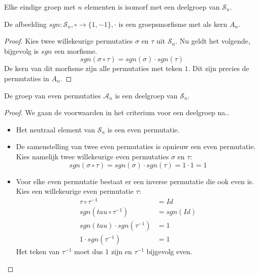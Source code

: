 \documentclass[main.tex]{subfiles}
\begin{document}
\begin{gev}
  Elke eindige groep met $n$ elementen is isomorf met een deelgroep van $\mathcal{S}_{n}$.

\end{gev}

\begin{pr}
  \label{pr:sgn-groepsmorfisme}
  De afbeelding $sgn: \mathcal{S}_{n},\circ \rightarrow \{1,-1\},\cdot$ is een groepsmorfisme met als kern $A_{n}$.

  \begin{proof}
    Kies twee willekeurige permutaties $\sigma$ en $\tau$ uit $\mathcal{S}_{n}$.
    Nu geldt het volgende, bijgevolg is $sgn$ een morfisme.
    \[ sgn(\sigma \circ \tau) = sgn(\sigma) \cdot sgn(\tau) \]
    De kern van dit morfisme zijn alle permutaties met teken $1$.
    Dit zijn precies de permutaties in $A_{n}$.
  \end{proof}
\end{pr}
 
\begin{pr}
  De groep van even permutaties $\mathcal{A}_{n}$ is een deelgroep van $\mathcal{S}_{n}$.
  \begin{proof}
    We gaan de voorwaarden in het criterium voor een deelgroep na..
    \begin{itemize}
    \item Het neutraal element van $\mathcal{S}_{n}$ is een even permutatie.
    \item De samenstelling van twee even permutaties is opnieuw een even permutatie.
      Kies namelijk twee willekeurige even permutaties $\sigma$ en $\tau$:
      \[ sgn(\sigma \circ \tau) = sgn(\sigma) \cdot sgn(\tau) = 1 \cdot 1 = 1 \]
    \item Voor elke even permutatie bestaat er een inverse permutatie die ook even is.
      Kies een willekeurige even permutatie $\tau$:
      \[
      \begin{array}{rl}
        \tau \circ \tau^{-1} &= Id\\
        sgn(tau \circ \tau^{-1}) &= sgn(Id)\\
        sgn(tau) \cdot sgn(\tau^{-1}) &= 1\\
        1 \cdot sgn(\tau^{-1}) &= 1
      \end{array}
      \]
      Het teken van $\tau^{-1}$ moet dus $1$ zijn en $\tau^{-1}$ bijgevolg even.
    \end{itemize}
  \end{proof}
\end{pr}
\end{document}
